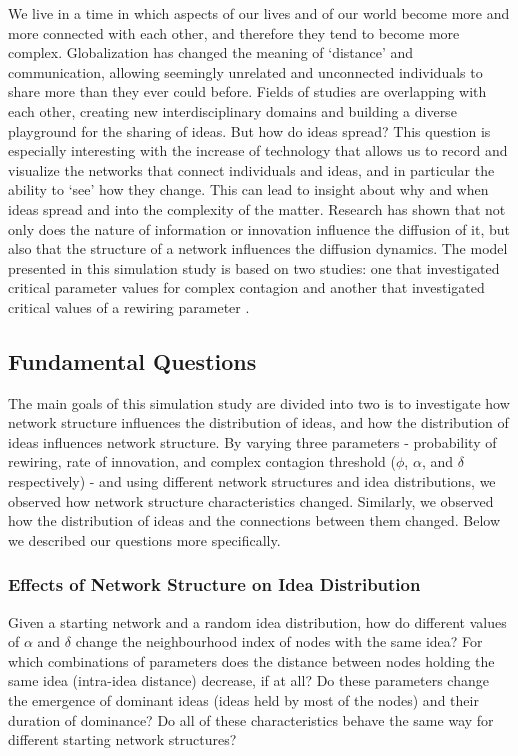 
We live in a time in which aspects of our lives and of our world become more and more connected with each other, and therefore they tend to become more complex. Globalization has changed the meaning of `distance' and communication, allowing seemingly unrelated and unconnected individuals to share more than they ever could before. Fields of studies are overlapping with each other, creating new interdisciplinary domains and building a diverse playground for the sharing of ideas. But how do ideas spread? This question is especially interesting with the increase of technology that allows us to record and visualize the networks that connect individuals and ideas, and in particular the ability to `see' how they change. This can lead to insight about why and when ideas spread and into the complexity of the matter. Research has shown that not only does the nature of information or innovation influence the diffusion of it, but also that the structure of a network influences the diffusion dynamics. The model presented in this simulation study is based on two studies: one that investigated critical parameter values for complex contagion \citep{CM2007} and another that investigated critical values of a rewiring parameter \citep{HN2006}.

\subsection{Fundamental Questions}

The main goals of this simulation study are divided into two is to investigate how network structure influences the distribution of ideas, and how the distribution of ideas influences network structure. By varying three parameters - probability of rewiring, rate of innovation, and complex contagion threshold ($\phi$, $\alpha$, and $\delta$ respectively) - and using different network structures and idea distributions, we observed how network structure characteristics changed. Similarly, we observed how the distribution of ideas and the connections between them changed. Below we described our questions more specifically.


\subsubsection{Effects of Network Structure on Idea Distribution}

Given a starting network and a random idea distribution, how do different values of $\alpha$ and $\delta$ change the neighbourhood index of nodes with the same idea? For which combinations of parameters does the distance between nodes holding the same idea (intra-idea distance) decrease, if at all? Do these parameters change the emergence of dominant ideas (ideas held by most of the nodes) and their duration of dominance? Do all of these characteristics behave the same way for different starting network structures? 

